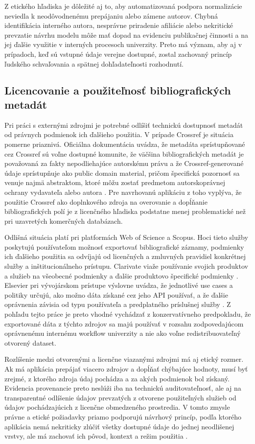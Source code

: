 Z etického hľadiska je dôležité aj to, aby automatizovaná podpora normalizácie neviedla k neodôvodnenému prepájaniu alebo zámene autorov. Chybná identifikácia interného autora, nesprávne priradenie afiliácie alebo nekritické prevzatie návrhu modelu môže mať dopad na evidenciu publikačnej činnosti a na jej ďalšie využitie v interných procesoch univerzity. Preto má význam, aby aj v prípadoch, keď sú vstupné údaje verejne dostupné, zostal zachovaný princíp ľudského schvaľovania a spätnej dohľadateľnosti rozhodnutí.

\subsection{Licencovanie a použiteľnosť bibliografických metadát}

Pri práci s externými zdrojmi je potrebné odlíšiť technickú dostupnosť metadát od právnych podmienok ich ďalšieho použitia. V prípade Crossref je situácia pomerne priaznivá. Oficiálna dokumentácia uvádza, že metadáta sprístupňované cez Crossref sú voľne dostupné komunite, že väčšina bibliografických metadát je považovaná za fakty nepodliehajúce autorskému právu a že Crossref-generované údaje sprístupňuje ako public domain material, pričom špecifická pozornosť sa venuje najmä abstraktom, ktoré môžu zostať predmetom autorskoprávnej ochrany vydavateľa alebo autora \cite{CrossrefMetadataRetrieval}. Pre navrhovanú aplikáciu z toho vyplýva, že použitie Crossref ako doplnkového zdroja na overovanie a dopĺňanie bibliografických polí je z licenčného hľadiska podstatne menej problematické než pri uzavretých komerčných databázach.

Odlišná situácia platí pri platformách Web of Science a Scopus. Hoci tieto služby poskytujú používateľom možnosť exportovať bibliografické záznamy, podmienky ich ďalšieho použitia sa odvíjajú od licenčných a zmluvných pravidiel konkrétnej služby a inštitucionálneho prístupu. Clarivate viaže používanie svojich produktov a služieb na všeobecné podmienky a ďalšie produktovo špecifické podmienky \cite{ClarivateTermsOfUse}. Elsevier pri vývojárskom prístupe výslovne uvádza, že jednotlivé use cases a politiky určujú, ako možno dáta získané cez jeho API používať, a že ďalšie oprávnenia závisia od typu používateľa a predplatného príslušnej služby \cite{ElsevierAPIPolicy}. Z pohľadu tejto práce je preto vhodné vychádzať z konzervatívneho predpokladu, že exportované dáta z týchto zdrojov sa majú používať v rozsahu zodpovedajúcom oprávnenému internému workflow univerzity a nie ako voľne redistribuovateľný otvorený dataset.

Rozlíšenie medzi otvorenými a licenčne viazanými zdrojmi má aj etický rozmer. Ak má aplikácia prepájať viacero zdrojov a dopĺňať chýbajúce hodnoty, musí byť zrejmé, z ktorého zdroja údaj pochádza a za akých podmienok bol získaný. Evidencia provenancie preto neslúži iba na technickú auditovateľnosť, ale aj na transparentné odlíšenie údajov prevzatých z otvorene použiteľných služieb od údajov pochádzajúcich z licenčne obmedzeného prostredia. V tomto zmysle právne a etické požiadavky priamo podporujú návrhový princíp, podľa ktorého aplikácia nemá nekriticky zlúčiť všetky dostupné údaje do jednej neodlišenej vrstvy, ale má zachovať ich pôvod, kontext a režim použitia \cite{CrossrefMetadataRetrieval}.
